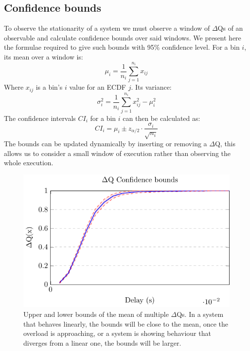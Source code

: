     \subsection{Confidence bounds}
    To observe the stationarity of a system we must observe a window of $\Delta$Qs of an observable and calculate confidence bounds over said windows. We present here the formulae required to give such bounds with 95\% confidence level. 
        For a bin $i$, its mean over a window is:
            \begin{equation}
                \mu_i = \dfrac{1}{n_i} \sum_{j=1}^{n_i} x_{ij}
                \label{eq:mean_ecdf}
            \end{equation}
        Where $x_{ij}$ is a bin's $i$ value for an ECDF $j$.
        Its variance:
            \begin{equation}
                \sigma^2_i = \dfrac{1}{n_i} \sum_{j=1}^{n_i} x^2_{ij} - \mu^2_i
                \label{eq:var_ecdf}
            \end{equation}
        The confidence intervals $CI_i$ for a bin $i$ can then be calculated as:
        \begin{equation}
            CI_i = \mu_i \pm z_{\alpha/2} \cdot \dfrac{\sigma_i}{\sqrt{n_i}}      
            \label{eq:ci_i}
        \end{equation}
    The bounds can be updated dynamically by inserting or removing a $\Delta$Q, this allows us to consider a small window of execution rather than observing the whole execution.
        \begin{figure}[H]
            \begin{center}
                \includegraphics[scale=1.2]{tikz/ci.pdf} 
            \end{center}
            \caption{Upper and lower bounds of the mean of multiple $\Delta$Qs. In a system that behaves linearly, the bounds will be close to the mean, once the overload is approaching, or a system is showing behaviour that diverges from a linear one, the bounds will be larger.}
        \end{figure}
